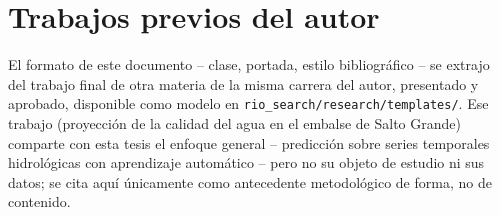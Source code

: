 \section{Trabajos previos del autor}

El formato de este documento -- clase, portada, estilo bibliogr\'afico -- se extrajo del trabajo
final de otra materia de la misma carrera del autor, presentado y aprobado, disponible como
modelo en \texttt{rio\_search/research/templates/}. Ese trabajo (proyecci\'on de la calidad del
agua en el embalse de Salto Grande) comparte con esta tesis el enfoque general -- predicci\'on
sobre series temporales hidrol\'ogicas con aprendizaje autom\'atico -- pero no su objeto de
estudio ni sus datos; se cita aqu\'i \'unicamente como antecedente metodol\'ogico de forma, no de
contenido.

